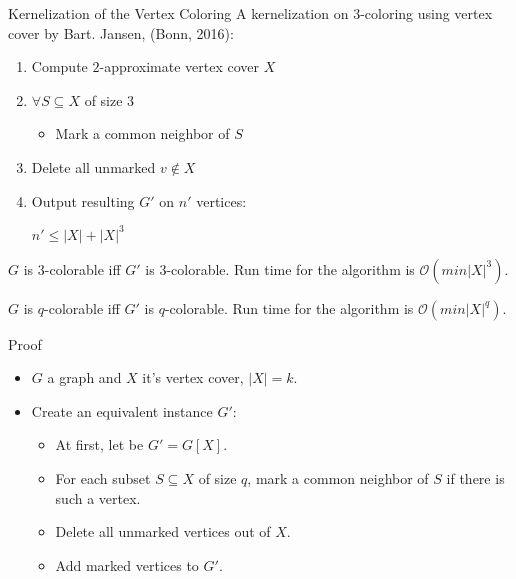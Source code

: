 \documentclass{beamer}
\begin{document}
\begin{frame}{Kernelization of the Vertex Coloring}
A kernelization on $3$-coloring using vertex cover by Bart. Jansen, (Bonn, 2016):
 
\begin{enumerate}
\item Compute $2$-approximate vertex cover $X$
 
\item $\forall S\subseteq X$ of size $3$
 
\begin{itemize}
\item Mark a common neighbor of $S$
\end{itemize}
 
\item Delete all unmarked $v \not\in X$
 
\item Output resulting $G'$ on $n'$ vertices:

\begin{center}
 
$n' \leq |X| + |X|^3$
\end{center}
\end{enumerate}
 
$G$ is $3$-colorable iff $G'$ is $3$-colorable. Run time for the algorithm is $\mathcal{O}(min|X|^3)$.

 
\begin{theorem}{\label{main theorem}}
$G$ is $q$-colorable iff $G'$ is $q$-colorable. Run time for the algorithm
is $\mathcal{O}(min|X|^q)$.
\end{theorem}
\end{frame}

\begin{frame}{Proof}
\begin{itemize}
\item $G$ a graph and $X$ it's vertex cover, $|X| = k$. 
 
\item Create an equivalent instance $G'$:
 
\begin{itemize}
\item At first, let be $G' = G[X]$. 
 
\item For each subset $S \subseteq X$ of size $q$, mark a common neighbor of $S$ if there is such a vertex.
 
\item Delete all unmarked vertices out of $X$. 
 
\item Add marked vertices to $G'$. 

\end{itemize}
\end{itemize}
\end{frame}
\end{document}

